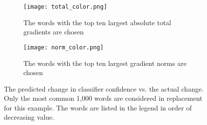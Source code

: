 \begin{figure}
\centering
\begin{subfigure}[t]{0.45\textwidth}
  \centering
  \texttt{[image: total\_color.png]}
  \caption{The words with the top ten largest absolute total gradients are chosen}
  \label{fig:total_color}
\end{subfigure}\hfill
\begin{subfigure}[t]{0.45\textwidth}
  \centering
  \texttt{[image: norm\_color.png]}
  \caption{The words with the top ten largest gradient norms are chosen}
  \label{fig:norm_color}
\end{subfigure}
\caption{The predicted change in classifier confidence vs. the actual change.  Only the most common 1,000 words are considered in replacement for this example.  The words are listed in the legend in order of decreasing value.}
\label{fig:outliers}
\end{figure}

